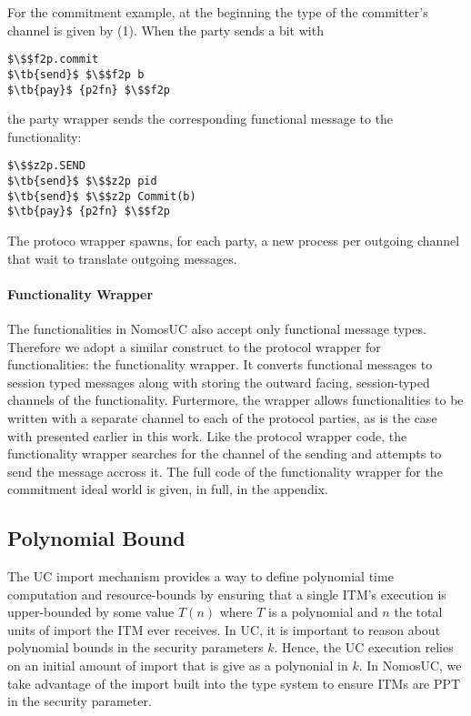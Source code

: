 For the commitment example, at the beginning the type of the committer's  channel is given by (1). 
When the party  sends a bit with
\begin{lstlisting}[basicstyle=\small\BeraMonottFamily, frame=single, mathescape]
$\$$f2p.commit 
$\tb{send}$ $\$$f2p b
$\tb{pay}$ {p2fn} $\$$f2p 
\end{lstlisting}
the party wrapper sends the corresponding functional message to the functionality:
\begin{lstlisting}[basicstyle=\small\BeraMonottFamily, frame=single, mathescape]
$\$$z2p.SEND 
$\tb{send}$ $\$$z2p pid 
$\tb{send}$ $\$$z2p Commit(b)
$\tb{pay}$ {p2fn} $\$$f2p
\end{lstlisting}
The protoco wrapper spawns, for each party, a new process per outgoing channel that wait to translate outgoing messages.

\paragraph{Functionality Wrapper}
The functionalities in NomosUC also accept only functional message types.
Therefore we adopt a similar construct to the protocol wrapper for functionalities: the functionality wrapper.
It converts functional messages to session typed messages along with storing the outward facing, session-typed channels of the functionality.
Furtermore, the wrapper allows functionalities to be written with a separate channel to each of the protocol parties, as is the case with \Fcom presented earlier in this work. 
Like the protocol wrapper code, the functionality wrapper searches for the channel of the sending  and attempts to send the message accross it.
The full code of the functionality wrapper for the commitment ideal world is given, in full, in the appendix. 

\subsection{Polynomial Bound}
The UC import mechanism provides a way to define polynomial time computation and resource-bounds by ensuring that a single ITM's execution is upper-bounded by some value $T(n)$ where $T$ is a polynomial and $n$ the total units of import the ITM ever receives.
In UC, it is important to reason about polynomial bounds in the security parameters $k$. Hence, the UC execution relies on an initial amount of import that is give as a polynonial in $k$. 
In NomosUC, we take advantage of the import built into the type system to ensure ITMs are PPT in the security parameter. 


